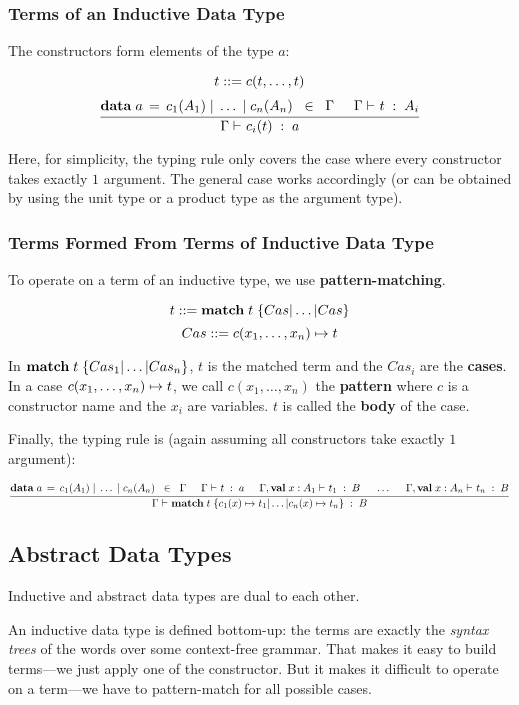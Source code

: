 \subsubsection{Terms of an Inductive Data Type}

The constructors form elements of the type $a$:

\[t ::= c(t,\ldots,t)\]
\[\rul{\adata{a}{c_1(A_1),\ldots,c_n(A_n)}\;\;\in\;\;\Gamma \tb \oftype{}{\Gamma}{t}{A_i}}{\oftype{}{\Gamma}{c_i(t)}{a}}\]

Here, for simplicity, the typing rule only covers the case where every constructor takes exactly $1$ argument.
The general case works accordingly (or can be obtained by using the unit type or a product type as the argument type).

\subsubsection{Terms Formed From Terms of Inductive Data Type}

To operate on a term of an inductive type, we use \textbf{pattern-matching}.

\[t \bbc \amatchI{t}{Cas,\ldots,Cas}\]
\[Cas ::= c(x_1,\ldots,x_n) \mapsto t\]

In $\amatchI{t}{Cas_1,\ldots,Cas_n}$, $t$ is the matched term and the $Cas_i$ are the \textbf{cases}.
In a case $c(x_1,\ldots,x_n) \mapsto t$, we call $c(x_1,\ldots,x_n)$ the \textbf{pattern} where $c$ is a constructor name and the $x_i$ are variables.
$t$ is called the \textbf{body} of the case.

Finally, the typing rule is (again assuming all constructors take exactly $1$ argument): 

\[\rul{\adata{a}{c_1(A_1),\ldots,c_n(A_n)}\;\;\in\;\;\Gamma \tb \oftype{}{\Gamma}{t}{a}\tb\oftype{}{\Gamma,\aval{x}{A_1}{}}{t_1}{B}\tb\ldots\tb\oftype{}{\Gamma,\aval{x}{A_n}{}}{t_n}{B}}
      {\oftype{}{\Gamma}{\amatchI{t}{\acase{c_1(x)}{t_1},\ldots,\acase{c_n(x)}{t_n}}}{B}}\]


\subsection{Abstract Data Types}

Inductive and abstract data types are dual to each other.

An inductive data type is defined bottom-up: the terms are exactly the \emph{syntax trees} of the words over some context-free grammar.
That makes it easy to build terms---we just apply one of the constructor.
But it makes it difficult to operate on a term---we have to pattern-match for all possible cases.

